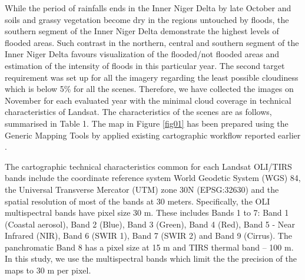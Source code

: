 \documentclass[remotesensing,article,submit,pdftex,moreauthors]{Definitions/mdpi}
\begin{document}
While the period of rainfalls ends in the Inner Niger Delta by late October and soils and grassy vegetation become dry in the regions untouched by floods, the southern segment of the Inner Niger Delta demonstrate the highest levels of flooded areas. Such contrast in the northern, central and southern segment of the  Inner Niger Delta favours visualization of the flooded/not flooded areas and estimation of the intensity of floods in this particular year. The second target requirement was set up for all the imagery regarding the least possible cloudiness which is below 5\% for all the scenes. Therefore, we have collected the images on November for each evaluated year with the minimal cloud coverage in technical characteristics of Landsat. The characteristics of the scenes are as follows, summarised in Table 1. The map in Figure \ref{fig01} has been prepared using the Generic Mapping Tools \cite{Wessel} by applied existing cartographic workflow reported earlier \cite{su142315966,LemenkovaDebeir2022JAES}. 

The cartographic technical characteristics common for each Landsat OLI/TIRS bands include the coordinate reference system World Geodetic System (WGS) 84, the Universal Transverse Mercator (UTM) zone 30N (EPSG:32630) and the spatial resolution of most of the bands at 30 meters. Specifically, the OLI multispectral bands have pixel size 30 m. These includes Bands 1 to 7: Band 1 (Coastal aerosol), Band 2 (Blue), Band 3 (Green), Band 4 (Red), Band 5 - Near Infrared (NIR), Band 6 (SWIR 1), Band 7 (SWIR 2) and Band 9 (Cirrus). The panchromatic Band 8 has a pixel size at 15 m and TIRS thermal band -- 100 m. In this study, we use the multispectral bands which limit the the precision of the maps to 30 m per pixel.
\end{document}
